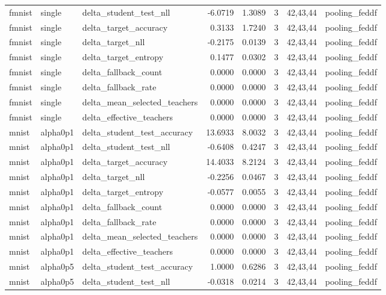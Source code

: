 \begin{tabular}{lllrrrll}
fmnist & single & delta\_student\_test\_nll & -6.0719 & 1.3089 & 3 & 42,43,44 & pooling\_feddf \\
fmnist & single & delta\_target\_accuracy & 0.3133 & 1.7240 & 3 & 42,43,44 & pooling\_feddf \\
fmnist & single & delta\_target\_nll & -0.2175 & 0.0139 & 3 & 42,43,44 & pooling\_feddf \\
fmnist & single & delta\_target\_entropy & 0.1477 & 0.0302 & 3 & 42,43,44 & pooling\_feddf \\
fmnist & single & delta\_fallback\_count & 0.0000 & 0.0000 & 3 & 42,43,44 & pooling\_feddf \\
fmnist & single & delta\_fallback\_rate & 0.0000 & 0.0000 & 3 & 42,43,44 & pooling\_feddf \\
fmnist & single & delta\_mean\_selected\_teachers & 0.0000 & 0.0000 & 3 & 42,43,44 & pooling\_feddf \\
fmnist & single & delta\_effective\_teachers & 0.0000 & 0.0000 & 3 & 42,43,44 & pooling\_feddf \\
mnist & alpha0p1 & delta\_student\_test\_accuracy & 13.6933 & 8.0032 & 3 & 42,43,44 & pooling\_feddf \\
mnist & alpha0p1 & delta\_student\_test\_nll & -0.6408 & 0.4247 & 3 & 42,43,44 & pooling\_feddf \\
mnist & alpha0p1 & delta\_target\_accuracy & 14.4033 & 8.2124 & 3 & 42,43,44 & pooling\_feddf \\
mnist & alpha0p1 & delta\_target\_nll & -0.2256 & 0.0467 & 3 & 42,43,44 & pooling\_feddf \\
mnist & alpha0p1 & delta\_target\_entropy & -0.0577 & 0.0055 & 3 & 42,43,44 & pooling\_feddf \\
mnist & alpha0p1 & delta\_fallback\_count & 0.0000 & 0.0000 & 3 & 42,43,44 & pooling\_feddf \\
mnist & alpha0p1 & delta\_fallback\_rate & 0.0000 & 0.0000 & 3 & 42,43,44 & pooling\_feddf \\
mnist & alpha0p1 & delta\_mean\_selected\_teachers & 0.0000 & 0.0000 & 3 & 42,43,44 & pooling\_feddf \\
mnist & alpha0p1 & delta\_effective\_teachers & 0.0000 & 0.0000 & 3 & 42,43,44 & pooling\_feddf \\
mnist & alpha0p5 & delta\_student\_test\_accuracy & 1.0000 & 0.6286 & 3 & 42,43,44 & pooling\_feddf \\
mnist & alpha0p5 & delta\_student\_test\_nll & -0.0318 & 0.0214 & 3 & 42,43,44 & pooling\_feddf \\

\end{tabular}
